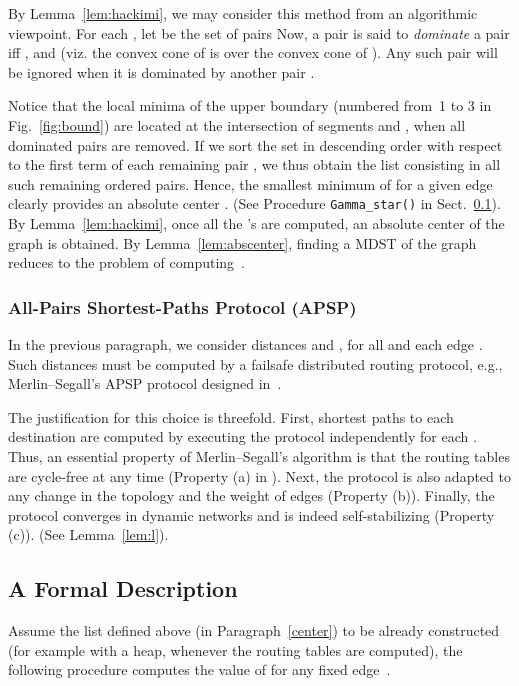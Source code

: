 \documentclass[10pt]{article}
\begin{document}
By Lemma~\ref{lem:hackimi}, we may consider this method from an
algorithmic viewpoint. For each , let  be the set of
pairs  Now, a pair  is said to {\em dominate} a
pair  iff , and  (viz. the
convex cone of  is over the convex cone of ).
Any such pair  will be ignored when it is dominated by
another pair .

Notice that the local minima of the upper boundary 
(numbered from~1 to 3 in Fig.~\ref{fig:bound}) are located at the
intersection of segments  and
, when all dominated pairs are removed. If we
sort the set  in descending order with respect to the
first term of each remaining pair , we thus obtain the list
 consisting in all such
remaining ordered pairs. Hence, the smallest minimum of 
for a given edge  clearly provides an absolute center .
(See Procedure {\tt Gamma\_star()} in Sect.~\ref{formal}). By
Lemma~\ref{lem:hackimi}, once all the 's are computed,
an absolute center  of the graph is obtained. By
Lemma~\ref{lem:abscenter}, finding a MDST of the graph reduces to
the problem of computing~.

\subsubsection{All-Pairs Shortest-Paths Protocol (APSP)}\label{apsp}\hfill

\noindent
In the previous paragraph, we consider distances
 and , for all  and each edge . Such
distances must be computed by a failsafe distributed routing protocol,
e.g., Merlin--Segall's APSP protocol designed in~\cite{MeSe79}.

The justification for this choice is threefold. First, shortest paths
to each destination  are computed by executing the protocol
independently for each . Thus, an essential property of
Merlin--Segall's algorithm is that the routing tables are cycle-free
at any time (Property (a) in \cite{MeSe79}).  Next, the protocol is
also adapted to any change in the topology and the weight of edges
(Property (b)).  Finally, the protocol converges in dynamic networks
and is indeed self-stabilizing (Property (c)). (See
Lemma~\ref{lem:l}).

\subsection{A Formal Description}\label{formal}
Assume the list  defined above (in Paragraph~\ref{center}) to be
already constructed (for example with a heap,
whenever the routing tables are computed), the following procedure computes
the value of  for any fixed edge~.
\end{document}
